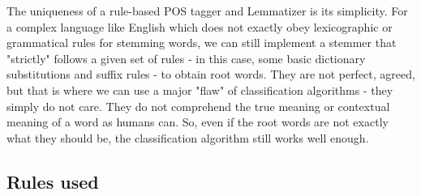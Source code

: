 \documentclass{article}
\begin{document}
The uniqueness of a rule-based POS tagger and Lemmatizer is its simplicity. For a complex language like English which does not exactly obey lexicographic or grammatical rules for stemming words, we can still implement a stemmer that "strictly" follows a given set of rules - in this case, some basic dictionary substitutions and suffix rules - to obtain root words. They are not perfect, agreed, but that is where we can use a major "flaw" of classification algorithms - they simply do not care. They do not comprehend the true meaning or contextual meaning of a word as humans can. So, even if the root words are not exactly what they should be, the classification algorithm still works well enough.

\subsection{Rules used}
\end{document}

